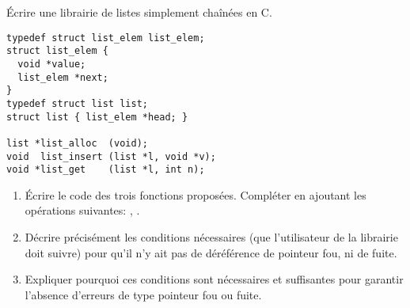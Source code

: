 \begin{Exercise}[title={Gestion mémoire manuelle}]
\label{ex:gestion_memoire_manuelle}
Écrire une librairie de listes simplement chaînées en C.

\begin{verbatim}
typedef struct list_elem list_elem;
struct list_elem {
  void *value;
  list_elem *next;
}
typedef struct list list;
struct list { list_elem *head; }

list *list_alloc  (void);
void  list_insert (list *l, void *v);
void *list_get    (list *l, int n);
\end{verbatim}

\begin{enumerate}
\item Écrire le code des trois fonctions proposées.  Compléter en ajoutant
  les opérations suivantes: , .

\item Décrire précisément les conditions nécessaires (que l'utilisateur de
  la librairie doit suivre) pour qu'il n'y ait pas de déréférence de
  pointeur fou, ni de fuite.

\item Expliquer pourquoi ces conditions sont nécessaires et suffisantes pour
  garantir l'absence d'erreurs de type pointeur fou ou fuite.
\end{enumerate}
\end{Exercise}

\begin{Answer}
\end{Answer}